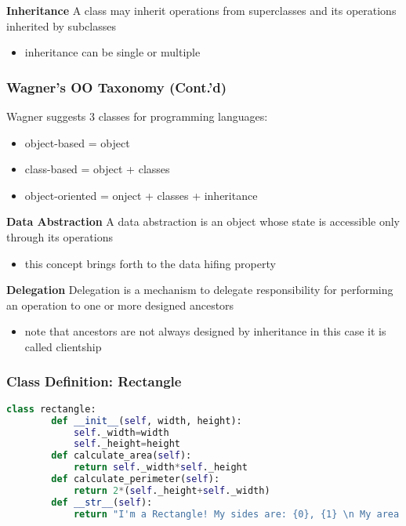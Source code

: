 \textbf{Inheritance}
A class may inherit operations from superclasses and its operations inherited by subclasses

\begin{itemize}
	\item  inheritance can be single or multiple
\end{itemize}

\subsubsection{Wagner’s OO Taxonomy (Cont.’d)}

Wagner suggests 3 classes for programming languages:

\begin{itemize}
	\item object-based = object
	\item class-based = object + classes
	\item object-oriented = onject + classes + inheritance
\end{itemize}

\textbf{Data Abstraction}
A data abstraction is an object whose state is accessible only through its operations

\begin{itemize}
	\item this concept brings forth to the data hifing property
\end{itemize}

\textbf{Delegation}
Delegation is a mechanism to delegate responsibility for performing an operation to one or more designed ancestors

\begin{itemize}
		\item note that ancestors are not always designed by inheritance in this case it is called clientship
\end{itemize}

\subsubsection{Class Definition: Rectangle}

\begin{lstlisting}[language=Python]
	class rectangle:
		def __init__(self, width, height):
			self._width=width
			self._height=height
		def calculate_area(self):
			return self._width*self._height
		def calculate_perimeter(self):
			return 2*(self._height+self._width)
		def __str__(self):
			return "I'm a Rectangle! My sides are: {0}, {1} \n My area is {2}".format(self._width,self._height, self.calculate_area())
\end{lstlisting}


